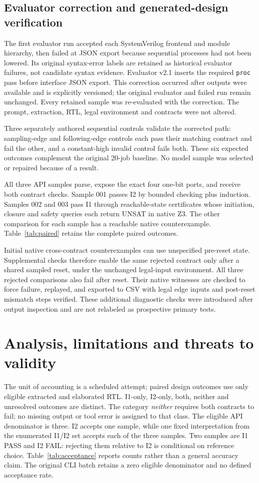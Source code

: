 \documentclass[11pt,a4paper]{article}
\begin{document}
\subsection{Evaluator correction and generated-design verification}
The first evaluator run accepted each SystemVerilog frontend and module hierarchy, then failed at JSON export because sequential processes had not been lowered. Its original syntax-error labels are retained as historical evaluator failures, not candidate syntax evidence. Evaluator v2.1 inserts the required \texttt{proc} pass before interface JSON export. This correction occurred after outputs were available and is explicitly versioned; the original evaluator and failed run remain unchanged. Every retained sample was re-evaluated with the correction. The prompt, extraction, RTL, legal environment and contracts were not altered.

Three separately authored sequential controls validate the corrected path: sampling-edge and following-edge controls each pass their matching contract and fail the other, and a constant-high invalid control fails both. These six expected outcomes complement the original 20-job baseline. No model sample was selected or repaired because of a result.

All three API samples parse, expose the exact four one-bit ports, and receive both contract checks. Sample 001 passes I2 by bounded checking plus induction. Samples 002 and 003 pass I1 through reachable-state certificates whose initiation, closure and safety queries each return UNSAT in native Z3. The other comparison for each sample has a reachable native counterexample. Table~\ref{tab:paired} retains the complete paired outcomes.

Initial native cross-contract counterexamples can use unspecified pre-reset state. Supplemental checks therefore enable the same rejected contract only after a shared sampled reset, under the unchanged legal-input environment. All three rejected comparisons also fail after reset. Their native witnesses are checked to force failure, replayed, and exported to CSV with legal edge inputs and post-reset mismatch steps verified. These additional diagnostic checks were introduced after output inspection and are not relabeled as prospective primary tests.

\section{Analysis, limitations and threats to validity}
The unit of accounting is a scheduled attempt; paired design outcomes use only eligible extracted and elaborated RTL. I1-only, I2-only, both, neither and unresolved outcomes are distinct. The category \emph{neither} requires both contracts to fail; no missing output or tool error is assigned to that class. The eligible API denominator is three. I2 accepts one sample, while one fixed interpretation from the enumerated I1/I2 set accepts each of the three samples. Two samples are I1 PASS and I2 FAIL: rejecting them relative to I2 is conditional on reference choice. Table~\ref{tab:acceptance} reports counts rather than a general accuracy claim. The original CLI batch retains a zero eligible denominator and no defined acceptance rate.
\end{document}
